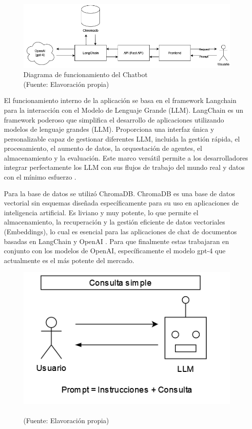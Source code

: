 \begin{figure}[ht!]
    \centering
    \includegraphics[width=.8\textwidth]{figures/finalhuemul.png}
    \caption[Diagrama de funcionamiento del Chatbot]{Diagrama de funcionamiento del Chatbot\\
    {\scriptsize (Fuente: Elavoración propia)}}
    \label{fig:chatbot1}
\end{figure}

El funcionamiento interno de la aplicación se basa en el framework Langchain para la interacción con el Modelo de Lenguaje Grande (LLM). 
LangChain es un framework poderoso que simplifica el desarrollo de aplicaciones utilizando modelos de lenguaje grandes (LLM). Proporciona 
una interfaz única y personalizable capaz de gestionar diferentes LLM, incluida la gestión rápida, el procesamiento, el aumento de datos, 
la orquestación de agentes, el almacenamiento y la evaluación. Este marco versátil permite a los desarrolladores integrar perfectamente 
los LLM con sus flujos de trabajo del mundo real y datos con el mínimo esfuerzo \cite{langchain1}.

Para la base de datos se utilizó ChromaDB. ChromaDB es una base de datos vectorial sin esquemas diseñada específicamente para 
su uso en aplicaciones de inteligencia artificial. Es liviano y muy potente, lo que permite el almacenamiento, la recuperación 
y la gestión eficiente de datos vectoriales (Embeddings), lo cual es esencial para las aplicaciones de chat de documentos 
basadas en LangChain y OpenAI \cite{langchain1}. Para que finalmente estas trabajaran en conjunto con los modelos de OpenAI, 
específicamente el modelo gpt-4 que actualmente es el más potente del mercado.

\begin{figure}[ht!]
    \centering
    \includegraphics[width=.4\textwidth]{figures/huemul6.png}
    \caption[]{\\
    {\scriptsize (Fuente: Elavoración propia)}}
    \label{fig:chatbot1}
\end{figure}


